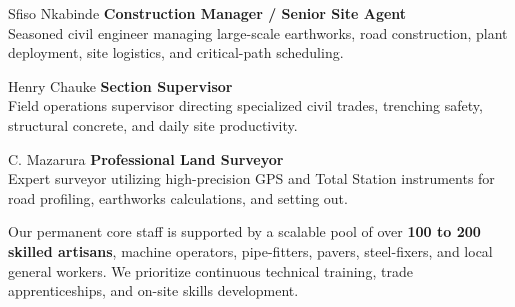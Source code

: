 \documentclass[a4paper,11pt]{article}
\begin{document}
\begin{minipage}[t]{0.485\textwidth}
    \begin{featurecard}{Sfiso Nkabinde}
        \textbf{Construction Manager / Senior Site Agent}\\
        \fontsize{8pt}{11pt}\selectfont\color{mhtextmuted}
        Seasoned civil engineer managing large-scale earthworks, road construction, plant deployment, site logistics, and critical-path scheduling.
    \end{featurecard}

    \vspace{0.2cm}

    \begin{featurecard}{Henry Chauke}
        \textbf{Section Supervisor}\\
        \fontsize{8pt}{11pt}\selectfont\color{mhtextmuted}
        Field operations supervisor directing specialized civil trades, trenching safety, structural concrete, and daily site productivity.
    \end{featurecard}

    \vspace{0.2cm}

    \begin{featurecard}{C. Mazarura}
        \textbf{Professional Land Surveyor}\\
        \fontsize{8pt}{11pt}\selectfont\color{mhtextmuted}
        Expert surveyor utilizing high-precision GPS and Total Station instruments for road profiling, earthworks calculations, and setting out.
    \end{featurecard}
\end{minipage}

\vspace{0.45cm}

\begin{tcolorbox}[
    enhanced,
    colback=mhoffwhite,
    colframe=mhnavy,
    boxrule=0.8pt,
    arc=4pt,
    left=10pt, right=10pt, top=10pt, bottom=10pt,
    title={\bfseries\color{white}\small Multi-Disciplinary Human Capital},
    colbacktitle=mhnavy
]
    \fontsize{8.5pt}{12pt}\selectfont\color{mhtext}
    Our permanent core staff is supported by a scalable pool of over \textbf{100 to 200 skilled artisans}, machine operators, pipe-fitters, pavers, steel-fixers, and local general workers. We prioritize continuous technical training, trade apprenticeships, and on-site skills development.
\end{tcolorbox}
\end{document}
